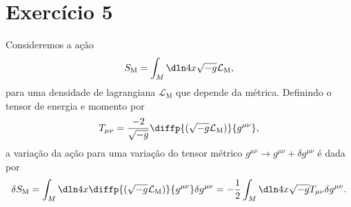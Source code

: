 \section*{Exercício 5}

Consideremos a ação
\begin{equation*}
    S_\mathrm{M} = \int_M \dln4x\sqrt{-g}\mathcal{L}_\mathrm{M},
\end{equation*}
para uma densidade de lagrangiana \(\mathcal{L}_\mathrm{M}\) que depende da métrica.
Definindo o tensor de energia e momento por
\begin{equation*}
    T_{\mu\nu} = \frac{-2}{\sqrt{-g}}\diffp{(\sqrt{-g}\mathcal{L}_\mathrm{M})}{g^{\mu\nu}},
\end{equation*}
a variação da ação para uma variação do tensor métrico \(g^{\mu\nu} \to g^{\mu\nu} + \delta g^{\mu\nu}\) é dada por
\begin{equation*}
    \delta S_\mathrm{M} = \int_M \dln4x \diffp{(\sqrt{-g}\mathcal{L}_\mathrm{M})}{g^{\mu\nu}}\delta g^{\mu\nu} =-\frac12\int_M\dln4x \sqrt{-g}T_{\mu\nu} \delta g^{\mu\nu}.
\end{equation*}

